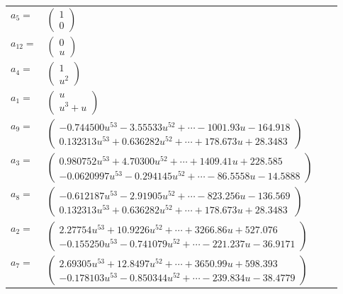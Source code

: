 \documentclass[1p]{elsarticle_modified}
\theoremstyle{definition}
\begin{document}
\begin{tabular}{m{7pt} m{180pt} m{7pt} m{180pt} }
\flushright $a_{5}=$&$\begin{pmatrix}1\\0\end{pmatrix}$ \\
\flushright $a_{12}=$&$\begin{pmatrix}0\\u\end{pmatrix}$ \\
\flushright $a_{4}=$&$\begin{pmatrix}1\\u^2\end{pmatrix}$ \\
\flushright $a_{1}=$&$\begin{pmatrix}u\\u^3+u\end{pmatrix}$ \\
\flushright $a_{9}=$&$\begin{pmatrix}-0.744500 u^{53}-3.55533 u^{52}+\cdots-1001.93 u-164.918\\0.132313 u^{53}+0.636282 u^{52}+\cdots+178.673 u+28.3483\end{pmatrix}$ \\
\flushright $a_{3}=$&$\begin{pmatrix}0.980752 u^{53}+4.70300 u^{52}+\cdots+1409.41 u+228.585\\-0.0620997 u^{53}-0.294145 u^{52}+\cdots-86.5558 u-14.5888\end{pmatrix}$ \\
\flushright $a_{8}=$&$\begin{pmatrix}-0.612187 u^{53}-2.91905 u^{52}+\cdots-823.256 u-136.569\\0.132313 u^{53}+0.636282 u^{52}+\cdots+178.673 u+28.3483\end{pmatrix}$ \\
\flushright $a_{2}=$&$\begin{pmatrix}2.27754 u^{53}+10.9226 u^{52}+\cdots+3266.86 u+527.076\\-0.155250 u^{53}-0.741079 u^{52}+\cdots-221.237 u-36.9171\end{pmatrix}$ \\
\flushright $a_{7}=$&$\begin{pmatrix}2.69305 u^{53}+12.8497 u^{52}+\cdots+3650.99 u+598.393\\-0.178103 u^{53}-0.850344 u^{52}+\cdots-239.834 u-38.4779\end{pmatrix}$ \\

\end{tabular}
\end{document}
